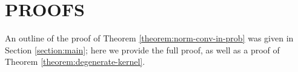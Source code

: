 \documentclass[]{article}
\begin{document}
\section{PROOFS}\label{section:proofs}

An outline of the proof of Theorem \ref{theorem:norm-conv-in-prob} was given in Section \ref{section:main}; here we provide the full proof, as well as a proof of Theorem \ref{theorem:degenerate-kernel}. 
%
%
%
%
\end{document}
